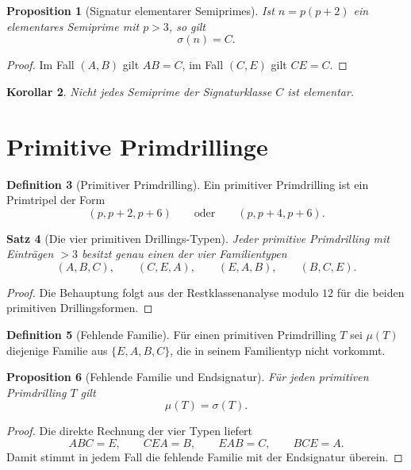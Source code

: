 \documentclass[12pt,a4paper]{article}
\newtheorem{satz}{Satz}[section]
\newtheorem{proposition}[satz]{Proposition}
\newtheorem{korollar}[satz]{Korollar}
\theoremstyle{definition}
\newtheorem{definition}[satz]{Definition}
\theoremstyle{remark}
\newcommand{\signatur}{\sigma}
\begin{document}
	\begin{proposition}[Signatur elementarer Semiprimes]
		Ist \(n=p(p+2)\) ein elementares Semiprime mit \(p>3\), so gilt
		\[
		\signatur(n)=C.
		\]
	\end{proposition}
	
	\begin{proof}
		Im Fall \((A,B)\) gilt \(AB=C\), im Fall \((C,E)\) gilt \(CE=C\).
	\end{proof}
	
	\begin{korollar}
		Nicht jedes Semiprime der Signaturklasse \(C\) ist elementar.
	\end{korollar}
	
	\section{Primitive Primdrillinge}
	
	\begin{definition}[Primitiver Primdrilling]
		Ein primitiver Primdrilling ist ein Primtripel der Form
		\[
		(p,p+2,p+6)
		\qquad\text{oder}\qquad
		(p,p+4,p+6).
		\]
	\end{definition}
	
	\begin{satz}[Die vier primitiven Drillings-Typen]
		Jeder primitive Primdrilling mit Einträgen \(>3\) besitzt genau einen der vier Familientypen
		\[
		(A,B,C),\qquad(C,E,A),\qquad(E,A,B),\qquad(B,C,E).
		\]
	\end{satz}
	
	\begin{proof}
		Die Behauptung folgt aus der Restklassenanalyse modulo \(12\) für die beiden primitiven Drillingsformen.
	\end{proof}
	
	\begin{definition}[Fehlende Familie]
		Für einen primitiven Primdrilling \(T\) sei \(\mu(T)\) diejenige Familie aus \(\{E,A,B,C\}\), die in seinem Familientyp nicht vorkommt.
	\end{definition}
	
	\begin{proposition}[Fehlende Familie und Endsignatur]
		Für jeden primitiven Primdrilling \(T\) gilt
		\[
		\mu(T)=\signatur(T).
		\]
	\end{proposition}
	
	\begin{proof}
		Die direkte Rechnung der vier Typen liefert
		\[
		ABC=E,\qquad CEA=B,\qquad EAB=C,\qquad BCE=A.
		\]
		Damit stimmt in jedem Fall die fehlende Familie mit der Endsignatur überein.
	\end{proof}
	
\end{document}
